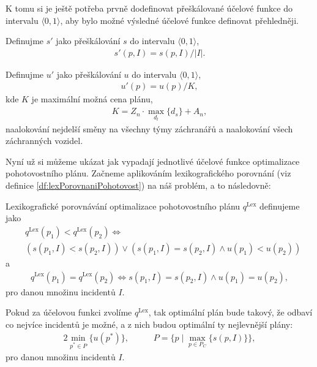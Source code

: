 K tomu si je ještě potřeba prvně dodefinovat přeškálované účelové funkce do intervalu $\langle 0, 1 \rangle$, aby
bylo možné výsledné účelové funkce definovat přehledněji.
\begin{definice} \label{df:simulaceSkal}
  Definujme $s'$ jako přeškálování $s$ do intervalu $\langle 0, 1 \rangle$,
  \begin{align*}
    s'(p, I) = s(p, I) / |I|.
  \end{align*}
\end{definice}
\begin{definice} \label{df:cenaPlanuSkal}
  Definujme $u'$ jako přeškálování $u$ do intervalu $\langle 0, 1 \rangle$,
  \begin{align*}
    u'(p) = u(p) / K,
  \end{align*}
  kde $K$ je maximální možná cena plánu,
  \begin{align*}
    K = Z_n \cdot \max_{d_l} \{ d_s \} + A_n,
  \end{align*}
  naalokování nejdelší směny na všechny týmy záchranářů a naalokování všech záchranných vozidel.
\end{definice}

Nyní už si můžeme ukázat jak vypadají jednotlivé účelové funkce optimalizace pohotovostního plánu.
Začneme aplikováním lexikografického porovnání (viz definice \ref{df:lexPorovnaniPohotovost}) na náš problém, a to následovně:
\begin{definice}\label{df:lexPorovnaniPohotovost}
  Lexikografické porovnávání optimalizace pohotovostního plánu $q^{\text{Lex}}$ definujeme jako
  \begin{align*}
    & q^{\text{Lex}}(p_1) < q^{\text{Lex}}(p_2)\Leftrightarrow\\
    & ( s(p_1, I) < s(p_2, I)) \lor (s(p_1, I) = s(p_2, I) \land u(p_1) < u(p_2))
  \end{align*}
  a 
  \begin{align*}
    q^{\text{Lex}}(p_1) = q^{\text{Lex}}(p_2) \Leftrightarrow s(p_1, I) = s(p_2, I) \land u(p_1) = u(p_2),
  \end{align*}
  pro danou množinu incidentů $I$.
\end{definice}

Pokud za účelovou funkci zvolíme $q^{\text{Lex}}$, tak optimální plán bude takový, že odbaví co nejvíce incidentů je možné, a z nich budou optimální ty nejlevnější plány:
\begin{alignat*}{2}
  \min_{p^* \in P} \{ u(p^*) \}, && \hspace{15pt} P = \{ p \mid \max_{p \in P_C} \{ s(p, I) \} \},
\end{alignat*}
pro danou množinu incidentů $I$.

